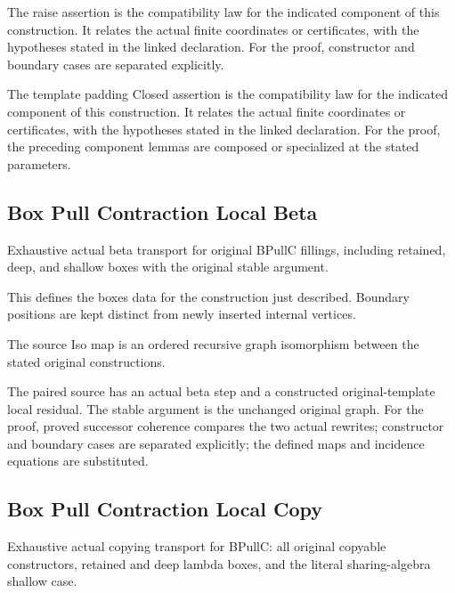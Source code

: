 The raise assertion is the compatibility law for the indicated component of this construction. It relates the actual finite coordinates or certificates, with the hypotheses stated in the linked declaration.
For the proof, constructor and boundary cases are separated explicitly.
\par{}

The template padding Closed assertion is the compatibility law for the indicated component of this construction. It relates the actual finite coordinates or certificates, with the hypotheses stated in the linked declaration.
For the proof, the preceding component lemmas are composed or specialized at the stated parameters.
\par{}

\subsection{Box Pull Contraction Local Beta}
Exhaustive actual beta transport for original BPullC fillings, including retained, deep, and shallow boxes with the original stable argument.

This defines the boxes data for the construction just described. Boundary positions are kept distinct from newly inserted internal vertices.
\par{}

The source Iso map is an ordered recursive graph isomorphism between the stated original constructions.
\par{}

The paired source has an actual beta step and a constructed original-template local residual. The stable argument is the unchanged original graph.
For the proof, proved successor coherence compares the two actual rewrites; constructor and boundary cases are separated explicitly; the defined maps and incidence equations are substituted.
\par{}

\subsection{Box Pull Contraction Local Copy}
Exhaustive actual copying transport for BPullC: all original copyable constructors, retained and deep lambda boxes, and the literal sharing-algebra shallow case.

